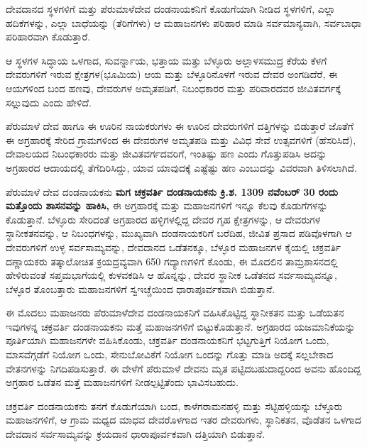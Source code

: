 ದೇವದಾನದ ಸ್ಥಳಗಳಿಗೆ ಮತ್ತು ಪೆರುಮಾಳೆದೇವ ದಂಡನಾಯಕನಿಗೆ ಕೊಡುಗೆಯಾಗಿ ನೀಡಿದ ಸ್ಥಳಗಳಿಗೆ, ಎಲ್ಲಾ ಹದಿಕೆಗಳನ್ನು, ಎಲ್ಲಾ ಬಾಧೆಯನ್ನು (ತೆರಿಗೆಗಳು) ಆ ಮಹಾಜನಗಳು ಪರಿಹಾರ ಮಾಡಿ ಸರ್ವಮಾನ್ಯವಾಗಿ, ಸರ್ವಬಾಧಾ ಪರಿಹಾರವಾಗಿ ಕೊಡುತ್ತಾರೆ.

ಆ ಸ್ಥಳಗಳ ಸಿದ್ಧಾಯ ಒಳಗಾದ, ಸುವರ್ನ್ನಾಯ, ಭತ್ತಾಯ ಮತ್ತು ಬೆಳ್ಳೂರು ಅಲ್ಲಾಳಸಮುದ್ರ ಕೆರೆಯ ಕೆಳಗೆ ದೇವರುಗಳಿಗೆ ಇರುವ ಕ್ಷೇತ್ರಗಳ(ಭೂಮಿಯ) ಆಯ ಮತ್ತು ಬೆಳ್ಳೂರಿನೊಳಗೆ ಇರುವ ದೇವರ ಅಂಗಡಿದೆರೆ, ಈ ಆಯಗಳಿಂದ ಬಂದ ಹಣವು, ದೇವರುಗಳ ಅಮೃತಪಡಿಗೆ, ನಿಬಂಧಕಾರರ ಮತ್ತು ಪರಿವಾರದವರ ಜೀವಿತವರ್ಗಕ್ಕೆ ಸಲ್ಲುವುದು ಎಂದು ಹೇಳಿದೆ.

ಪೆರುಮಾಳೆ ದೇವ ಹಾಗೂ ಈ ಊರಿನ ನಾಯಕರುಗಳು ಈ ಊರಿನ ದೇವರುಗಳಿಗೆ ದತ್ತಿಗಳನ್ನು ಬಿಡುತ್ತಾರೆ ಜೊತೆಗೆ ಈ ಅಗ್ರಹಾರಕ್ಕೆ ಸೇರಿದ ಗ್ರಾಮಗಳಿಂದ ಈ ದೇವರುಗಳ ಅಮೃತಪಡಿ ಮತ್ತು ವಿವಿಧ ಸೇವೆ ಉತ್ಸವಗಳಿಗೆ (ಹೆಸರಿಸಿದೆ), ದೇವಾಲಯದ ನಿಬಂಧಕಾರರು ಮತ್ತು ಜೀವಿತವರ್ಗದವರಿಗೆ, ಇಂತಿಷ್ಟು ಹಣ ಎಂದು ಗೊತ್ತುಪಡಿಸಿ ಅದನ್ನು ಅಗ್ರಹಾರದ ಆದಾಯದಲ್ಲಿ ತೆಗೆದಿರಿಸಿದ್ದು, ಯಾವ ಯಾವುದಕ್ಕೆ ಎಷ್ಟೆಷ್ಟು ಹಣ ಎಂಬುದನ್ನು ವಿವರವಾಗಿ ತಿಳಿಸಲಾಗಿದೆ.

ಪೆರುಮಾಳೆ ದೇವ ದಂಡನಾಯಕನು \textbf{ಮಗ ಚಕ್ರವರ್ತಿ ದಂಡನಾಯಕನು ಕ್ರಿ.ಶ. 1309 ನವೆಂಬರ್​ 30 ರಂದು ಮತ್ತೊಂದು ಶಾಸನವನ್ನು ಹಾಕಿಸಿ, }ಈ ಅಗ್ರಹಾರಕ್ಕೆ ಮತ್ತು ಮಹಾಜನಗಳಿಗೆ ಇನ್ನೂ ಕೆಲವು ಕೊಡುಗೆಗಳನ್ನು ಕೊಡುತ್ತಾನೆ. ಬೆಳ್ಳೂರು ಸೇರಿದಂತೆ ಅಗ್ರಹಾರದ ಹಳ್ಳಿಗಳಲ್ಲಿದ್ದ ದೇವರ ಗೃಹ ಕ್ಷೇತ್ರಗಳನ್ನು, ಆ ದೇವರುಗಳ ಸ್ಥಾನೀಕತನವನ್ನು, ಆ ನಿಬಂಧಗಳನ್ನು, ಮುಖ್ಯವಾಗಿ ದಂಡನಾಯಕರಿಗೆ ಬರೆದಿಹ, ಜೀವಿತ ಪ್ರಸಾದ ಪಡಿವೊಳಗಾಗಿ ಆ ದೇವರುಗಳಿಗೆ ಉಳ್ಳ ಸರ್ವಸಾಮ್ಯವನ್ನು, ದೇವದಾನದ ಒಡೆತನಕ್ಕೂ, ಬೆಳ್ಳೂರ ಮಹಾಜನಗಳ ಕೈಯಲ್ಲಿ ಚಕ್ರವರ್ತಿ ದಣ್ಣಾಯಕರು ತತ್ಕಾಲೋಚಿತ ಕ್ರಯದ್ರವ್ಯವಾಗಿ 650 ಗದ್ಯಾಣಗಳಿಗೆ ಕೊಂಡು, ಈ ಮೊದಲಿನ ತಾಮ್ರಶಾಸನದಲ್ಲಿ ಹೇಳಿರುವಂತೆ ಸಪ್ತಮಭಾಗೆಯಲ್ಲಿ ಕುಳವಕಡಿಸಿ ಆ ಹೊನ್ನನ್ನು, ದೇವರ ಸ್ಥಾನೀಕ ಒಡೆತನದ ಸರ್ವಸಾಮ್ಯವನ್ನೂ, ಬೆಳ್ಳೂರ ತೊಂಬತ್ತಾರು ಮಹಾಜನಗಳಿಗೆ ಸ್ವಇಚ್ಚೆಯಿಂದ ಧಾರಾಪೂರ್ವಕವಾಗಿ ಬಿಡುತ್ತಾನೆ.

ಈ ಮೊದಲು ಮಹಾಜನರು ಪೆರುಮಾಳೆದೇವ ದಂಡನಾಯಕನಿಗೆ ವಹಿಸಿಕೊಟ್ಟಿದ್ದ ಸ್ಥಾನೀಕತನ ಮತ್ತು ಒಡೆಯತನ ಇವುಗಳನ್ನ ಚಕ್ರವರ್ತಿ ದಂಡನಾಯಕನು ಮತ್ತೆ ಮಹಾಜನಗಳಿಗೆ ಬಿಟ್ಟುಕೊಡುತ್ತಾನೆ. ಅಗ್ರಹಾರದ ಯಜಮಾನಿಕೆಯನ್ನು ಪೂರ್ತಿಯಾಗಿ ಮಹಾಜನಗಳೇ ವಹಿಸಿಕೊಂಡು, ಚಕ್ರವರ್ತಿ ದಂಡನಾಯಕನಿಗೆ ಭಟ್ಟಗುತ್ತಿಗೆ ನಿಯೋಗ ಒಂದು, ಮಾಸವೆಗ್ಗಡೆಗೆ ನಿಯೋಗ ಒಂದು, ಸೇನುಬೋವಿಕೆಗೆ ನಿಯೋಗ ಒಂದನ್ನು ಗೊತ್ತು ಮಾಡಿ ಅದಕ್ಕೆ ಸಲ್ಲಬೇಕಾದ ವೇತನಗಳನ್ನು ನಿಗದಿಪಡಿಸು\-ತ್ತಾರೆ. ಈ ವೇಳೆಗೆ ಪೆರುಮಾಳೆ ದೇವನು ಮೃತ ಪಟ್ಟಿದಬಹುದಾದ್ದರಿಂದ ಅವನು ಹೊಂದಿದ್ದ ಅಗ್ರಹಾರ ಒಡೆತನ ಮತ್ತೆ ಮಹಾಜನಗಳಿಗೆ ನೀಡಲ್ಪಟ್ಟಿತೆಂದು ಭಾವಿಸಬಹುದು.

ಚಕ್ರವರ್ತಿ ದಂಡನಾಯಕನು ತನಗೆ ಕೊಡುಗೆಯಾಗಿ ಬಂದ, ಕಾಳೆಗರಾಮನಹಳ್ಳಿ ಮತ್ತು ಸೆಟ್ಟಿಹಳ್ಳಿಯನ್ನು ಬೆಳ್ಳೂರು ಮಹಾಜನಗಳಿಗೆ, ಆ ಗ್ರಾಮ ಮಧ್ಯದ ಮಾಧವ ದೇವರೊಳಗಾದ ಇತರ ದೇವರುಗಳು, ಸ್ಥಾನಿಕತನ, ವೊಡೆತನ ಒಳಗಾದ ದೇವದಾನ ಸರ್ವಸಾಮ್ಯವನ್ನು ಕ್ರಯದಾನ ಧಾರಾಪೂರ್ವಕವಾಗಿ ದತ್ತಿಯಾಗಿ ಬಿಡುತ್ತಾನೆ.

